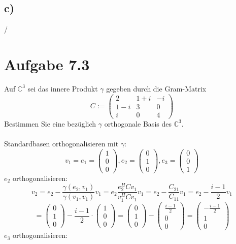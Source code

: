 \documentclass{article} %
\begin{document}
\subsection*{c)}
/
\section{Aufgabe 7.3}
Auf $\mathbb{C}^3$ sei das innere Produkt $\gamma$ gegeben durch die Gram-Matrix
\[C := \begin{pmatrix}
2 &1 + i & -i \\
1 - i & 3 & 0 \\
i & 0& 4
\end{pmatrix}
\]
Bestimmen Sie eine bezüglich $\gamma$ orthogonale Basis des $\mathbb{C}^3$. \\ \\
Standardbasen orthogonalisieren mit $\gamma$:
\[
v_1 = e_1 = \begin{pmatrix}
1\\0\\0
\end{pmatrix},  e_2 = \begin{pmatrix}
0\\1\\0
\end{pmatrix},  e_3 = \begin{pmatrix}
0\\0\\1
\end{pmatrix}
\]
$e_2$ orthogonalisieren: 
\[
v_2 = e_2 - \frac{\gamma(e_2, v_1)}{\gamma(v_1, v_1)} v_1 = e_2 \frac{e_2^H C v_1}{v_1^H C v_1}v_1    = e_2 - \frac{C_{21}}{C_{11}}v_1  = e_2 - \frac{i-1}{2}v_1 
\]
\[
= \begin{pmatrix}
0\\1\\0
\end{pmatrix} -  \frac{i-1}{2} \cdot \begin{pmatrix}
1\\0\\0
\end{pmatrix} = \begin{pmatrix}
0\\1\\0
\end{pmatrix} -  \begin{pmatrix}
\frac{i-1}{2}\\0\\0
\end{pmatrix} = \begin{pmatrix}
-\frac{i-1}{2}\\1\\0
\end{pmatrix} 
\]
$e_3$ orthogonalisieren: 
\end{document}
